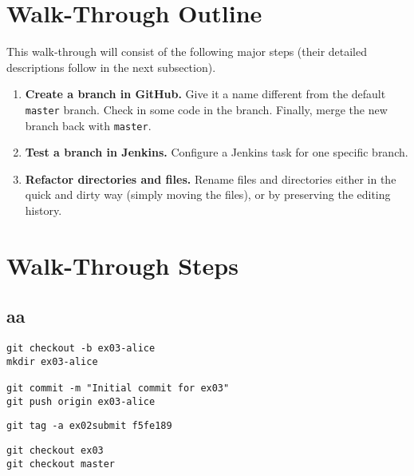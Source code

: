 \documentclass[11pt,a4paper]{article}
\begin{document}
\section{Walk-Through Outline}

This walk-through will consist of the following major steps (their detailed descriptions
follow in the next subsection).

\begin{enumerate}
\item {\bf Create a branch in GitHub.} Give it a name different from the default {\tt master} branch. 
Check in some code in the branch. Finally, merge the new branch back with {\tt master}.
\item {\bf Test a branch in Jenkins.} Configure a Jenkins task for one specific branch. 
\item {\bf Refactor directories and files.} Rename files and directories either in the quick and dirty way 
(simply moving the files), or by preserving the editing history.
\end{enumerate}


\section{Walk-Through Steps}

\subsection{aa}

\begin{Verbatim}
git checkout -b ex03-alice
mkdir ex03-alice

git commit -m "Initial commit for ex03"
git push origin ex03-alice
\end{Verbatim}

\begin{Verbatim}
git tag -a ex02submit f5fe189
\end{Verbatim}

\begin{Verbatim}
git checkout ex03
git checkout master
\end{Verbatim}



\end{document}

